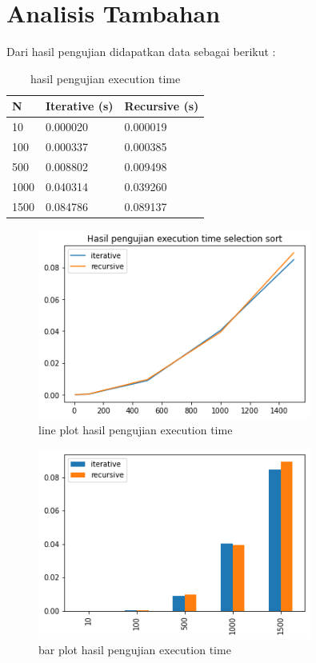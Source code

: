 \documentclass[12pt]{article}
\begin{document}
\section{Analisis Tambahan}
Dari hasil pengujian didapatkan data sebagai berikut :
\begin{table}[h!]
    \centering
    \begin{tabular}{|l|l|l|}
    \hline
    N   & Iterative (s) & Recursive (s) \\ \hline
    10	&0.000020	&0.000019\\ \hline
100	&0.000337	&0.000385\\ \hline
500	&0.008802	&0.009498\\ \hline
1000	&0.040314	&0.039260\\ \hline
1500	&0.084786	&0.089137\\ \hline    
    \end{tabular}
    \caption{hasil pengujian execution time}
\end{table}
\begin{figure}[ht!]
    \centering
    \includegraphics[width=0.8\textwidth]{images/output_27_1.png}
    \caption{line plot hasil pengujian execution time}
\end{figure}
\begin{figure}[ht!]
    \centering
    \includegraphics[width=0.8\textwidth]{images/output_28_1.png}
    \caption{bar plot hasil pengujian execution time}
\end{figure}
\newpage
\end{document}
